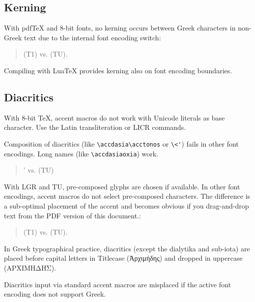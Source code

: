 \documentclass[a4paper, parskip=true]{scrartcl}
\newcommand*{\greekfontencoding}{TU}
\newcommand*{\greekfontencoding}{LGR}
\newcommand*{\latinencoding}{T1}
\newcommand{\cs}[1]{\texttt{\textbackslash#1}}
\begin{document}
  \subsection{Kerning}

  With pdfTeX and 8-bit fonts, no kerning occurs between Greek characters in
  non-Greek text due to the internal font encoding switch:
  \begin{quote}
    \textAlpha\textUpsilon\textAlpha{} (\latinencoding) vs.
    \ensuregreek{\textAlpha\textUpsilon\textAlpha} (\greekfontencoding).
  \end{quote}
  Compiling with LuaTeX provides kerning also on font encoding boundaries.


  \subsection{Diacritics}

  With 8-bit TeX, accent macros do not work with Unicode literals as base
  character. Use the Latin transliteration or LICR commands.

  \medskip\noindent
  Composition of diacritics (like \verb|\accdasia\acctonos| or \cs{<\'})
  fails in other font encodings. Long names (like \cs{accdasiaoxia}) work.
  \begin{quote}
    \<'\textalpha{} vs.
     (\greekfontencoding)
  \end{quote}
  With LGR and TU, pre-composed glyphs are chosen if available. In other font
  encodings, accent macros do not select pre-composed characters.
  The difference is a sub-optimal placement of the accent and becomes
  obvious if you drag-and-drop text from the PDF version of this document.:
  \begin{quote}
    \accdasiaoxia\textalpha{} (\latinencoding) vs.
    \ensuregreek{\accdasiaoxia\textalpha{}} (\greekfontencoding).
  \end{quote}
  In Greek typographical practice, diacritics (except the dialytika and
  sub-iota) are placed before capital letters in Titlecase (Ἀρχιμήδης) and
  dropped in uppercase (ΑΡΧΙΜΗΔΗΣ).

  Diacritics input via standard accent macros are misplaced
  if the active font encoding does not support Greek.
\end{document}
